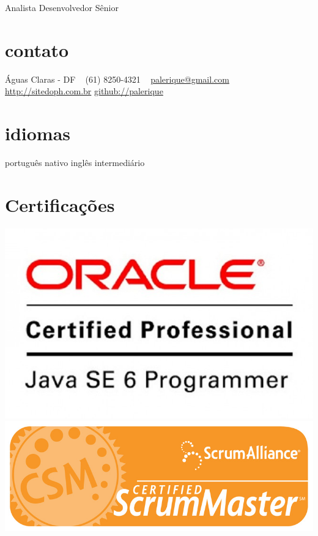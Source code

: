 
       {Analista Desenvolvedor Sênior}


\begin{aside}
  \section{contato}
    Águas Claras - DF
    ~
    (61) 8250-4321
    ~
    \href{mailto:palerique@gmail.com}{palerique@gmail.com}
    \href{http://sitedoph.com.br}{http://sitedoph.com.br}
    \href{http://github.com/palerique/}{github://palerique}
  \section{idiomas}
    português nativo
    inglês intermediário
  \section{Certificações}
    \includegraphics[scale=0.13]{ocpjp.jpg}
    \includegraphics[scale=0.13]{csm.png}
\end{aside}

